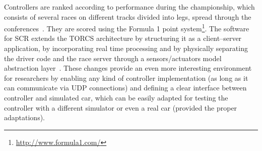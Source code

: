 Controllers are ranked according to performance during the championship, which consists of several races on different tracks divided into legs, spread through the conferences~\cite{2009}. They are scored using the Formula 1 point system\footnote{\url{http://www.formula1.com/}}. The software for SCR extends the TORCS architecture by structuring it as a client–server application, by incorporating real time processing and by physically separating the driver code and the race server through a sensors/actuators model abstraction layer~\cite{2009}. These changes provide an even more interesting environment for researchers by enabling any kind of controller implementation (as long as it can communicate via UDP connections) and defining a clear interface between controller and simulated car, which can be easily adapted for testing the controller with a different simulator or even a real car (provided the proper adaptations).








